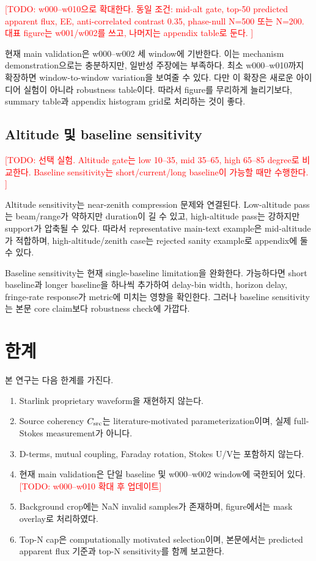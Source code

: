 \documentclass[11pt,a4paper]{article}
\newcommand{\todo}[1]{\textcolor{red}{[TODO: #1]}}
\begin{document}
\todo{
w000--w010으로 확대한다.
동일 조건: mid-alt gate, top-50 predicted apparent flux, EE, anti-correlated contrast 0.35, phase-null N=500 또는 N=200.
대표 figure는 w001/w002를 쓰고, 나머지는 appendix table로 둔다.
}

현재 main validation은 w000--w002 세 window에 기반한다.
이는 mechanism demonstration으로는 충분하지만, 일반성 주장에는 부족하다.
최소 w000--w010까지 확장하면 window-to-window variation을 보여줄 수 있다.
다만 이 확장은 새로운 아이디어 실험이 아니라 robustness table이다.
따라서 figure를 무리하게 늘리기보다, summary table과 appendix histogram grid로 처리하는 것이 좋다.

\subsection{Altitude 및 baseline sensitivity}

\todo{
선택 실험.
Altitude gate는 low 10--35, mid 35--65, high 65--85 degree로 비교한다.
Baseline sensitivity는 short/current/long baseline이 가능할 때만 수행한다.
}

Altitude sensitivity는 near-zenith compression 문제와 연결된다.
Low-altitude pass는 beam/range가 약하지만 duration이 길 수 있고, high-altitude pass는 강하지만 support가 압축될 수 있다.
따라서 representative main-text example은 mid-altitude가 적합하며, high-altitude/zenith case는 rejected sanity example로 appendix에 둘 수 있다.

Baseline sensitivity는 현재 single-baseline limitation을 완화한다.
가능하다면 short baseline과 longer baseline을 하나씩 추가하여 delay-bin width, horizon delay, fringe-rate response가 metric에 미치는 영향을 확인한다.
그러나 baseline sensitivity는 본문 core claim보다 robustness check에 가깝다.

\section{한계}

본 연구는 다음 한계를 가진다.

\begin{enumerate}
  \item Starlink proprietary waveform을 재현하지 않는다.
  \item Source coherency $C_{\rm src}$는 literature-motivated parameterization이며, 실제 full-Stokes measurement가 아니다.
  \item D-terms, mutual coupling, Faraday rotation, Stokes U/V는 포함하지 않는다.
  \item 현재 main validation은 단일 baseline 및 w000--w002 window에 국한되어 있다. \todo{w000--w010 확대 후 업데이트}
  \item Background crop에는 NaN invalid samples가 존재하며, figure에서는 mask overlay로 처리하였다.
  \item Top-N cap은 computationally motivated selection이며, 본문에서는 predicted apparent flux 기준과 top-N sensitivity를 함께 보고한다.
\end{enumerate}
\end{document}
